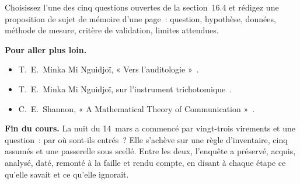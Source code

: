 \begin{boxexo}[title={\ding{45}\quad Exercice~16.4. Un sujet de recherche \niveauexpert}]
Choisissez l'une des cinq questions ouvertes de la section~16.4 et rédigez
une proposition de sujet de mémoire d'une page~: question, hypothèse,
données, méthode de mesure, critère de validation, limites attendues.
\end{boxexo}

\bigskip

\begin{boxinfo}
\textbf{Pour aller plus loin.}
\begin{itemize}
    \item T.~E.~Minka Mi Nguidjoï, « Vers l'auditologie »~\cite{minka2026auditologie}.
    \item T.~E.~Minka Mi Nguidjoï, sur l'instrument
          trichotomique~\cite{minka2026nek}.
    \item C.~E.~Shannon, « A Mathematical Theory of
          Communication »~\cite{shannon1948}.
\end{itemize}
\end{boxinfo}

\begin{boxinfo}
\textbf{Fin du cours.} La nuit du 14~mars a commencé par vingt-trois
virements et une question~: par où sont-ils entrés~? Elle s'achève sur une
règle d'inventaire, cinq \NEK{} assumés et une passerelle sous scellé. Entre
les deux, l'enquête a préservé, acquis, analysé, daté, remonté à la faille
et rendu compte, en disant à chaque étape ce qu'elle savait et ce qu'elle
ignorait.
\end{boxinfo}
